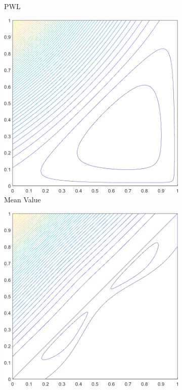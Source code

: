 \begin{figure}
\begin{subfigure}[b]{0.39\textwidth}
		\caption{PWL}
	\end{subfigure}
	\vfill
	\begin{subfigure}[b]{0.39\textwidth}
		\centering
		\includegraphics[width=\textwidth]{figures/sec_BF/square_MV2_contour_b4.png}
		\caption{Mean Value}
	\end{subfigure}
	\hspace{1.5cm}
	\begin{subfigure}[b]{0.39\textwidth}
		\centering
		\includegraphics[width=\textwidth]{figures/sec_BF/square_MAXENT2_contour_b4.png}

\end{subfigure}
\end{figure}
